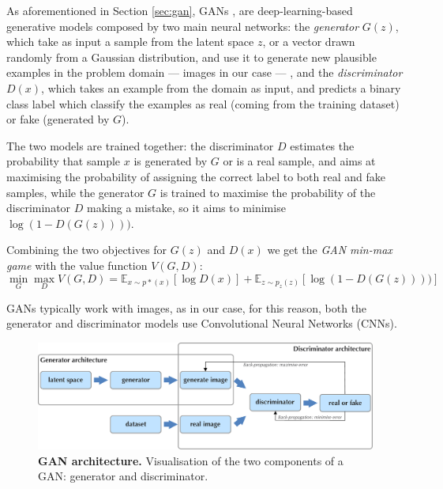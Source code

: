 \documentclass{article}
\begin{document}
	As aforementioned in Section \ref{sec:gan}, GANs \cite{goodfellow2014generative}, are 
	deep-learning-based generative models composed by two main neural networks: 
	the \textit{generator} ${G(z)}$, which take as input a sample from the latent space $z$, or a vector 
	drawn randomly from a Gaussian distribution, and use it to generate new plausible examples in the 
	problem domain — images in our case — , and the \textit{discriminator} ${D(x)}$, which takes an 
	example from the domain as input, and predicts a binary class label which classify the examples as 
	real (coming from the training dataset) or fake (generated by $G$). 
	
	The two models are trained together: the discriminator $D$ estimates the probability that 
	sample $x$ is generated by $G$ or is a real sample, and aims at maximising the probability of 
	assigning the correct label to both real and fake samples, while the generator $G$ is trained to 
	maximise the probability of the discriminator $D$ making a mistake, so it aims to minimise 
	$\log(1-D(G(z))))$.
	
	Combining the two objectives for $G(z)$ and $D(x)$ we get the \textit{GAN min-max game} with the 
	value function $V(G,D)$:
	\begin{equation}
		\label{e:minmaxgame}
		\min_G \max_D V(G,D) = 
		\mathbb{E}_{x \sim p*(x)} [\log D(x)] + \mathbb E _{z \sim p_z(z)} [\log (1-D(G(z))))]
	\end{equation}
	
	GANs typically work with images, as in our case, for this reason, both the generator and 
	discriminator models use Convolutional Neural Networks (CNNs).
	\begin{figure}[htb]				
		\centering
		\includegraphics[width=.65\linewidth]{images/GAN}
		\caption{\textbf{GAN architecture.} Visualisation of the two components of a GAN: generator and 
			discriminator.}
		\label{fig:gan}
	\end{figure}
	
\end{document}
